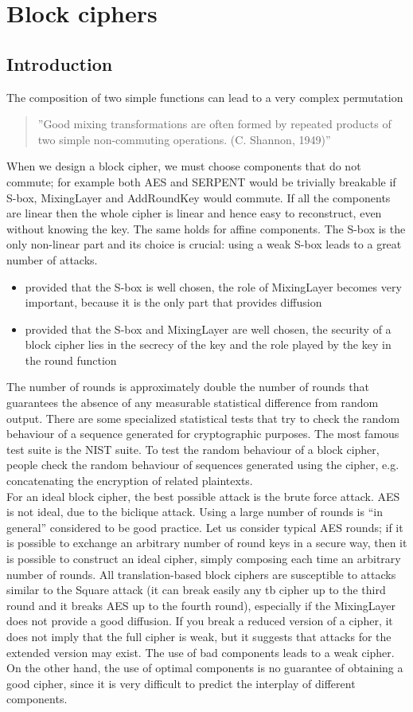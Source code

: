 \documentclass[a4paper, 10pt, titlepage]{article}
\begin{document}
\newpage
\section{Block ciphers}
\subsection{Introduction}
The composition of two simple functions can lead to a very complex
permutation
\begin{quote}
”Good mixing transformations are often formed by repeated
products of two simple non-commuting operations.
(C. Shannon, 1949)” 
\end{quote}
When we design a block cipher, we must choose components that do not commute; for example both AES and SERPENT would be trivially breakable if S-box, MixingLayer and AddRoundKey would commute.
If all the components are linear then the whole cipher is linear and hence easy to reconstruct, even without knowing the key. The same holds for affine components. The S-box is the only non-linear part and its choice is crucial: using a weak S-box leads to a great number of attacks.
\begin{itemize}
\item provided that the S-box is well chosen, the role of MixingLayer becomes very important, because it is the only part that provides diffusion
\item provided that the S-box and MixingLayer are well chosen, the security of a block cipher lies in the secrecy of the key and the role played by the key in the round function
\end{itemize}
The number of rounds is approximately double the number of rounds
that guarantees the absence of any measurable statistical difference
from random output. There are some specialized statistical tests that try to check the random behaviour of a sequence generated for cryptographic purposes. The most famous test suite is the NIST suite. To test the random behaviour of a block cipher, people check the random behaviour of sequences generated using the cipher, e.g. concatenating the encryption of related plaintexts. \\ 
For an ideal block cipher, the best possible attack is the brute force attack.
AES is not ideal, due to the biclique attack. Using a large number of rounds is “in general” considered to be good practice.
Let us consider typical AES rounds; if it is possible to exchange an arbitrary number of round keys in a secure way, then it is possible to construct an ideal cipher, simply composing each time an arbitrary number of rounds. All translation-based block ciphers are susceptible to attacks similar to the Square attack (it can break easily any tb cipher up to the third round and it breaks AES up to the fourth round), especially if the MixingLayer does not provide a good diffusion. If you break a reduced version of a cipher, it does not imply that the full cipher is weak, but it suggests that attacks for the extended version may exist. The use of bad components leads to a weak cipher. On the other hand, the use of optimal components is no guarantee of obtaining a good cipher, since it is very difficult to predict the interplay of different components.
\end{document}

